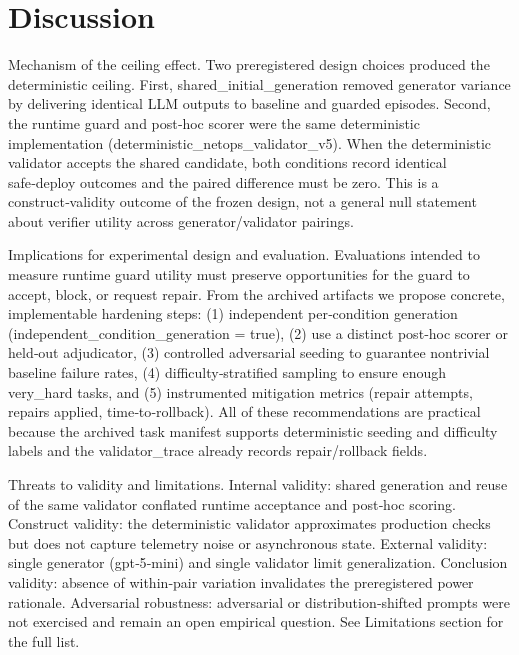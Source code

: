 \documentclass[conference]{IEEEtran}
\begin{document}
\section{Discussion}
Mechanism of the ceiling effect. Two preregistered design choices produced the deterministic ceiling. First, shared\_initial\_generation removed generator variance by delivering identical LLM outputs to baseline and guarded episodes. Second, the runtime guard and post‑hoc scorer were the same deterministic implementation (deterministic\_netops\_validator\_v5). When the deterministic validator accepts the shared candidate, both conditions record identical safe‑deploy outcomes and the paired difference must be zero. This is a construct‑validity outcome of the frozen design, not a general null statement about verifier utility across generator/validator pairings.

Implications for experimental design and evaluation. Evaluations intended to measure runtime guard utility must preserve opportunities for the guard to accept, block, or request repair. From the archived artifacts we propose concrete, implementable hardening steps: (1) independent per‑condition generation (independent\_condition\_generation = true), (2) use a distinct post‑hoc scorer or held‑out adjudicator, (3) controlled adversarial seeding to guarantee nontrivial baseline failure rates, (4) difficulty‑stratified sampling to ensure enough very\_hard tasks, and (5) instrumented mitigation metrics (repair attempts, repairs applied, time‑to‑rollback). All of these recommendations are practical because the archived task manifest supports deterministic seeding and difficulty labels and the validator\_trace already records repair/rollback fields.

Threats to validity and limitations. Internal validity: shared generation and reuse of the same validator conflated runtime acceptance and post‑hoc scoring. Construct validity: the deterministic validator approximates production checks but does not capture telemetry noise or asynchronous state. External validity: single generator (gpt‑5‑mini) and single validator limit generalization. Conclusion validity: absence of within‑pair variation invalidates the preregistered power rationale. Adversarial robustness: adversarial or distribution‑shifted prompts were not exercised and remain an open empirical question. See Limitations section for the full list.
\end{document}
